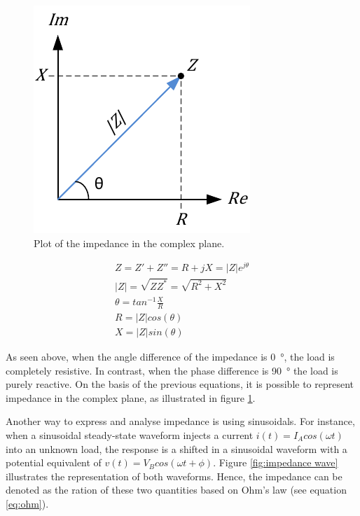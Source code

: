 \begin{figure}[!htpb]
	\centering
	\includegraphics{figure_2}    
	\caption[Complex representation of impedance]{Plot of the impedance in the complex plane.}
	\label{fig:complex impedance}
\end{figure}

\begin{gather}
	\label{eq:Z magnitude}
	Z = Z' + Z'' = R + jX = \lvert Z \rvert e^{j\theta}\\
	|Z| = \sqrt{Z Z^{*}} = \sqrt{R^2 + X^2} \\
	\theta = tan^{-1}\frac{X}{R} \\
	\label{eq:resistance}
	R = \lvert Z \rvert cos(\theta) \\
	\label{eq:reactance}
	X = \lvert Z \rvert sin(\theta)
\end{gather}

As seen above, when the angle difference of the impedance is \SI{0}{\degree}, the load is completely resistive. In contrast, when the phase difference is \SI{90}{\degree} the load is purely reactive. On the basis of the previous equations, it is possible to represent impedance in the complex plane, as illustrated in figure \ref{fig:complex impedance}.

Another way to express and analyse impedance is using sinusoidals. For instance, when a sinusoidal steady-state waveform injects a current $i(t) = I_A cos(\omega t)$ into an unknown load, the response is a shifted in a sinusoidal waveform with a potential equivalent of $v(t) = V_B cos(\omega t + \phi)$. Figure \ref{fig:impedance wave} illustrates the representation of both waveforms. Hence, the impedance can be denoted as the ration of these two quantities based on Ohm's law (see equation \ref{eq:ohm}).

